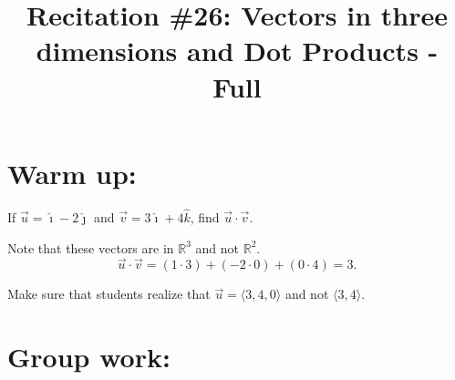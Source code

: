 \documentclass[]{ximera}
\title{Recitation \#26: Vectors in three dimensions and Dot Products - Full}
\begin{document}
\begin{abstract}		\end{abstract}
\maketitle


\section{Warm up:}
If $\vec{u} = \hat{\imath} - 2 \hat{\jmath}$ and $\vec{v} = 3 \hat{\imath} + 4 \hat{k}$, find $\vec{u} \cdot \vec{v}$.
	\begin{freeResponse}
	Note that these vectors are in $\mathbb{R}^3$ and not $\mathbb{R}^2$.
	\[
	\vec{u} \cdot \vec{v} = (1 \cdot 3) + (-2 \cdot 0) + (0 \cdot 4) = \boxed{3}.
	\]
	\end{freeResponse}
	
\begin{instructorNotes}
Make sure that students realize that $\vec{u} = \langle 3,4,0 \rangle$ and not $\langle 3,4 \rangle$.
\end{instructorNotes}







\section{Group work:}
\end{document}
